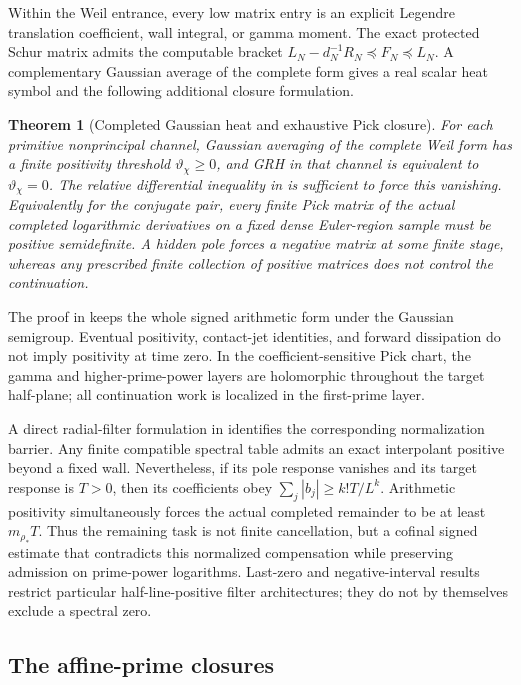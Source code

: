 \documentclass[11pt]{article}
\newtheorem{theorem}{Theorem}[section]
\theoremstyle{definition}
\theoremstyle{remark}
\begin{document}
Within the Weil entrance, every low matrix entry is an explicit Legendre
translation coefficient, wall integral, or gamma moment.  The exact protected
Schur matrix admits the computable bracket
$L_N-d_N^{-1}R_N\preceq F_N\preceq L_N$.
A complementary Gaussian average of the complete form gives a real scalar
heat symbol and the following additional closure formulation.

\begin{theorem}[Completed Gaussian heat and exhaustive Pick closure]
\label{thm:intro-heat-pick-GRH}
For each primitive nonprincipal channel, Gaussian averaging of the complete
Weil form has a finite positivity threshold $\vartheta_\chi\ge0$, and
GRH in that channel is equivalent to $\vartheta_\chi=0$.
The relative differential inequality in
 is sufficient to force this vanishing.
Equivalently for the conjugate pair, every finite Pick matrix of the actual
completed logarithmic derivatives on a fixed dense Euler-region sample must
be positive semidefinite.  A hidden pole forces a negative matrix at some
finite stage, whereas any prescribed finite collection of positive matrices
does not control the continuation.
\end{theorem}

The proof in  keeps the whole signed arithmetic
form under the Gaussian semigroup.  Eventual positivity, contact-jet
identities, and forward dissipation do not imply positivity at time zero.
In the coefficient-sensitive Pick chart, the gamma and higher-prime-power
layers are holomorphic throughout the target half-plane; all continuation
work is localized in the first-prime layer.

A direct radial-filter formulation in
 identifies the corresponding
normalization barrier.  Any finite compatible spectral table admits an
exact interpolant positive beyond a fixed wall.  Nevertheless, if its pole
response vanishes and its target response is $T>0$, then its coefficients
obey $\sum_j|b_j|\ge k!T/L^k$.  Arithmetic positivity simultaneously
forces the actual completed remainder to be at least $m_{\rho_*}T$.
Thus the remaining task is not finite cancellation, but a cofinal signed
estimate that contradicts this normalized compensation while preserving
admission on prime-power logarithms.  Last-zero and negative-interval
results restrict particular half-line-positive filter architectures;
they do not by themselves exclude a spectral zero.

\subsection{The affine-prime closures}
\end{document}
